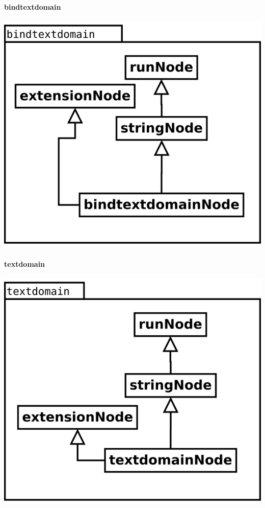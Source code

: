 \begin{multicols}{2}
\paragraph {bindtextdomain}
\begin{center}
\includegraphics[scale=0.4]{bindtextdomain.png} \\
\end{center}
\paragraph {textdomain}
\begin{center}
\includegraphics[scale=0.4]{textdomain.png} \\
\end{center}
\end{multicols}

